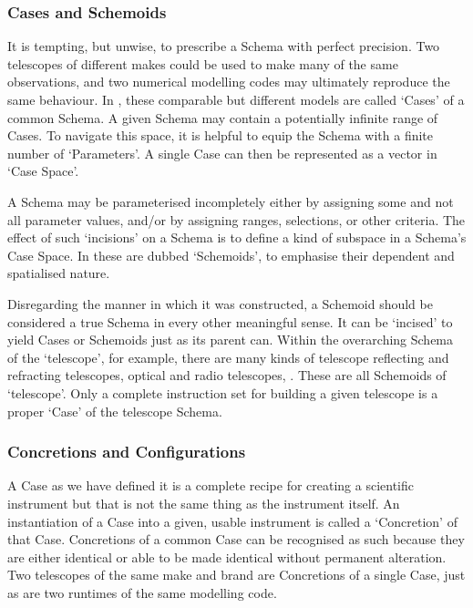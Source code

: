 \documentclass[letterpaper,10pt,english]{jupyterBook}
\begin{document}
\subsubsection{Cases and Schemoids}
\label{\detokenize{content/chapter_03_everest/doctrine:cases-and-schemoids}}
\sphinxAtStartPar
It is tempting, but unwise, to prescribe a Schema with perfect precision. Two telescopes of different makes could be used to make many of the same observations, and two numerical modelling codes may ultimately reproduce the same behaviour. In , these comparable but different models are called ‘Cases’ of a common Schema. A given Schema may contain a potentially infinite range of Cases. To navigate this space, it is helpful to equip the Schema with a finite number of ‘Parameters’. A single Case can then be represented as a vector in ‘Case Space’.

\sphinxAtStartPar
A Schema may be parameterised incompletely \sphinxhyphen{} either by assigning some and not all parameter values, and/or by assigning ranges, selections, or other criteria. The effect of such ‘incisions’ on a Schema is to define a kind of subspace in a Schema’s Case Space. In  these are dubbed ‘Schemoids’, to emphasise their dependent and spatialised nature.

\sphinxAtStartPar
Disregarding the manner in which it was constructed, a Schemoid should be considered a true Schema in every other meaningful sense. It can be ‘incised’ to yield Cases or Schemoids just as its parent can. Within the overarching Schema of the ‘telescope’, for example, there are many kinds of telescope \sphinxhyphen{} reflecting and refracting telescopes, optical and radio telescopes, . These are all Schemoids of ‘telescope’. Only a complete instruction set for building a given telescope is a proper ‘Case’ of the telescope Schema.


\subsubsection{Concretions and Configurations}
\label{\detokenize{content/chapter_03_everest/doctrine:concretions-and-configurations}}
\sphinxAtStartPar
A Case as we have defined it is a complete recipe for creating a scientific instrument \sphinxhyphen{} but that is not the same thing as the instrument itself. An instantiation of a Case into a given, usable instrument is called a ‘Concretion’ of that Case. Concretions of a common Case can be recognised as such because they are either identical or able to be made identical without permanent alteration. Two telescopes of the same make and brand are Concretions of a single Case, just as are two runtimes of the same modelling code.
\end{document}

